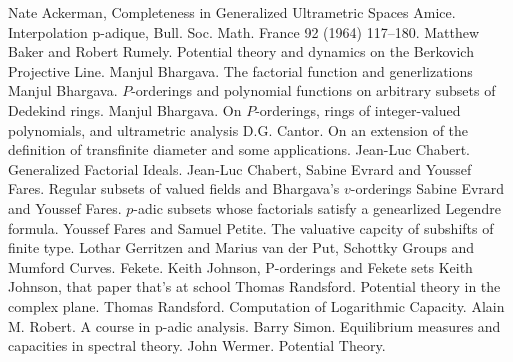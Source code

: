 \documentclass[12pt]{dalthesis}
\theoremstyle{plain}
\theoremstyle{definition}
\begin{document}
%	

\begin{thebibliography}{9}
 Nate Ackerman,  Completeness in Generalized Ultrametric Spaces
 Amice. Interpolation p-adique, Bull. Soc. Math. France 92 (1964) 117–180.
 Matthew Baker and Robert Rumely. Potential theory and dynamics on the Berkovich Projective Line.
 Manjul Bhargava. The factorial function and generlizations
 Manjul Bhargava. $P$-orderings and polynomial functions on arbitrary subsets of Dedekind rings.
 Manjul Bhargava. On $ P$-orderings, rings of integer-valued polynomials, and ultrametric analysis
  D.G. Cantor. On an extension of the definition of transfinite diameter and some applications.  
 Jean-Luc Chabert. Generalized Factorial Ideals.
 Jean-Luc Chabert, Sabine Evrard and Youssef Fares. Regular subsets of valued fields and Bhargava’s $v$-orderings
 Sabine Evrard and Youssef Fares. $p$-adic subsets whose factorials satisfy a genearlized Legendre formula.
 Youssef Fares and Samuel Petite. The valuative capcity of subshifts of finite type.
 Lothar Gerritzen and Marius van der Put, Schottky Groups and Mumford Curves.
 Fekete.
 Keith Johnson, P-orderings and Fekete sets
 Keith Johnson, that paper that's at school
 Thomas Randsford. Potential theory in the complex plane.
 Thomas Randsford. Computation of Logarithmic Capacity.
 Alain M. Robert. A course in p-adic analysis.
 Barry Simon. Equilibrium measures and capacities in spectral theory.
 John Wermer. Potential Theory.
\end{thebibliography}
\end{document}
